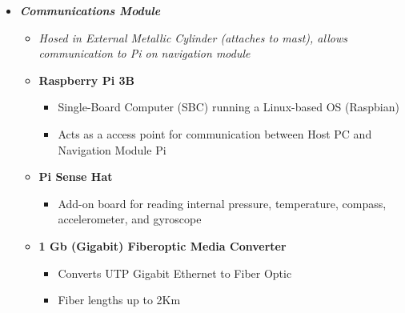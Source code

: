 \documentclass[12pt]{article}
\begin{document}
{{\begin{itemize}
\begin{itemize}
\begin{itemize}
							\item 12-Pin Com Connector (for fiber optic connection between navigation module and communication module, pins 8-12 unused)
							\item 16-Pin Auxiliary Connector (pins 4-16 unused)
							\item 16-Pin Thruster Connector (pins 16 unused)
							\item Pressure Sensor
						\end{itemize}
						\item[] \textbf{Misc.}
						\begin{itemize}
							\item Realtime Clock (I2C)
							\item Arduino Nano (read voltage)
							\item Power regulator
							\item Pi Camera V2\\\\
						\end{itemize}
					\end{itemize}
				\item \textbf{\textit{Communications Module}}
				\begin{itemize}
					\item[] \textit{Hosed in External Metallic Cylinder (attaches to mast), allows communication to Pi on navigation module\\}
					\item[] \textbf{Raspberry Pi 3B}
					\begin{itemize}
						\item Single-Board Computer (SBC) running a Linux-based OS (Raspbian)
						\item Acts as a access point for communication between Host PC and Navigation Module Pi
					\end{itemize}
					\item[] \textbf{Pi Sense Hat}
					\begin{itemize}
						\item Add-on board for reading internal pressure, temperature, compass, accelerometer, and gyroscope
					\end{itemize}
					\item[] \textbf{1 Gb (Gigabit) Fiberoptic Media Converter}
					\begin{itemize}
						\item Converts UTP Gigabit Ethernet to Fiber Optic
						\item Fiber lengths up to 2Km

\end{itemize}
\end{itemize}
\end{itemize}}}
\end{document}
